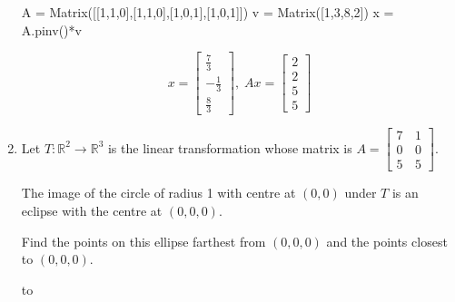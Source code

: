 \documentclass[11pt]{article}
\newcommand{\hdotrule}[1]{\hbox to \textwidth{\leaders\hbox to #1pt{\hss . \hss}\hfil}}
\begin{document}
\begin{preview}
\begin{enumerate}
            \begin{python}
                  A = Matrix([[1,1,0],[1,1,0],[1,0,1],[1,0,1]])
                  v = Matrix([1,3,8,2])
                  x = A.pinv()*v
            \end{python}

            $$x=\begin{bmatrix}\frac{7}{3}\\-\frac{1}{3}\\\frac{8}{3}\end{bmatrix},\; Ax= \begin{bmatrix}2\\2\\5\\5\end{bmatrix}$$
            
            \setcounter{enumi}{4}
            \item Let $T : \mathbb{R}^2 \rightarrow \mathbb{R}^3$ is the linear transformation whose matrix is $A = \begin{bmatrix}
                  7 &\, 1 \\ 0 &\, 0 \\ 5 &\, 5 
            \end{bmatrix}$. 
            
            The image of the circle of radius 1 with centre at $(0,0)$ under $T$ is an eclipse with the centre at $(0,0,0)$. 
            
            Find the points on this ellipse farthest from $(0,0,0)$ and the points closest to $(0,0,0)$.

            \hdotrule{5}


\end{enumerate}
\end{preview}
\end{document}
